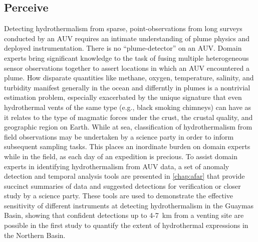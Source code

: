 \subsection{Perceive}
Detecting hydrothermalism from sparse, point-observations from long surveys conducted by an AUV requires an intimate understanding of plume physics and deployed instrumentation.
There is no ``plume-detector'' on an AUV.
Domain experts bring significant knowledge to the task of fusing multiple heterogeneous sensor observations together to assert locations in which an AUV encountered a plume.
How disparate quantities like methane, oxygen, temperature, salinity, and turbidity manifest generally in the ocean and differntly in plumes is a nontrivial estimation problem, especially exacerbated by the unique signature that even hydrothermal vents of the same type (e.g., black smoking chimneys) can have as it relates to the type of magmatic forces under the crust, the crustal quality, and geographic region on Earth.
While at sea, classification of hydrothermalism from field observations may be undertaken by a science party in order to inform subsequent sampling tasks. 
This places an inordinate burden on domain experts while in the field, as each day of an expedition is precious. 
To assist domain experts in identifying hydrothermalism from AUV data, a set of anomaly detection and temporal analysis tools are presented in \cref{chap:afar} that provide succinct summaries of data and suggested detections for verification or closer study by a science party.
These tools are used to demonstrate the effective sensitivity of different instruments at detecting hydrothermalism in the Guaymas Basin, showing that confident detections up to 4-\SI{7}{\kilo\meter} from a venting site are possible in the first study to quantify the extent of hydrothermal expressions in the Northern Basin.

